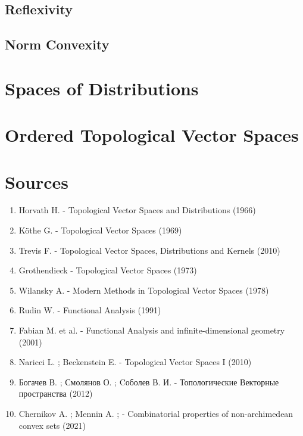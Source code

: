\documentclass[12pt]{scrartcl}
\renewcommand{\.}{\; . \;}
\begin{document}
\subsection{Reflexivity}
\subsection{Norm Convexity}
\section{Spaces of Distributions}
\section{Ordered Topological Vector Spaces}
\newpage
\section*{Sources}
\begin{enumerate}
\item Horvath H. - Topological Vector Spaces and Distributions (1966)
\item K\"othe G. - Topological Vector Spaces (1969)
\item Trevis F.  - Topological Vector Spaces, Distributions and Kernels (2010)
\item Grothendieck - Topological Vector Spaces (1973)
\item Wilansky A. - Modern Methods in Topological Vector Spaces (1978) 
\item Rudin W.  - Functional Analysis (1991) 
\item Fabian M. et al.   - Functional Analysis and infinite-dimensional geometry (2001)
\item Naricci L. ; Beckenstein E. - Topological Vector Spaces I (2010)
\item Богачев В. ; Смолянов О. ; Cоболев В. И. -  Топологические Векторные пространства (2012)
\item Chernikov A. ; Mennin A. ; -  Combinatorial properties of non-archimedean convex sets  (2021)
\end{enumerate}
\end{document}
